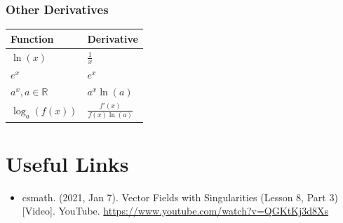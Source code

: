 \documentclass{article}
\begin{document}
\subsubsection{Other Derivatives}
\begin{tabular}{ll}
\hline
Function & Derivative \\
\hline
\(\ln(x)\) & \(\frac{1}{x}\) \\
\(e^x\) & \(e^x\) \\
\(a^x, a \in \mathbb{R}\) & \(a^x\ln(a)\) \\
\(\log_a(f(x))\) & \(\frac{f'(x)}{f(x)\ln(a)}\) \\
\hline
\end{tabular}
\section{Useful Links}
\begin{itemize} 
    \item csmath. (2021, Jan 7). Vector Fields with Singularities (Lesson 8, Part 3) [Video]. YouTube. \url{https://www.youtube.com/watch?v=QGKtKj3d8Xs}
\end{itemize}
\end{document}
